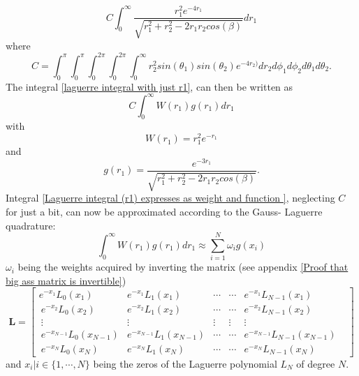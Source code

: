 \documentclass[10pt,a4paper]{article}
\begin{document}
\begin{equation}\label{laguerre integral with just r1}
C\int_{0}^{\infty}\frac{r_1^2e^{-4r_1}}{\sqrt{r_1^2+r_2^2-2r_1r_2cos(\beta)}}dr_1
\end{equation}
where
\begin{equation*}
C = \int_{0}^{\pi}\int_{0}^{\pi}\int_{0}^{2\pi}\int_{0}^{2\pi}\int_{0}^{\infty} r_2^2sin(\theta_1)sin(\theta_2)e^{-4r_2)}dr_2d\phi_1d\phi_2d\theta_1d\theta_2.
\end{equation*}
The integral \ref{laguerre integral with just r1}, can then be written as
\begin{equation}\label{Laguerre integral (r1) expresses as weight and function }
C\int_{0}^{\infty}W(r_1)g(r_1)dr_1
\end{equation}
with
\begin{equation*}
W(r_1)=r_1^2 e^{-r_1}
\end{equation*}
and
\begin{equation*}
g(r_1)=\frac{e^{-3r_1}}{\sqrt{r_1^2+r_2^2-2r_1r_2cos(\beta)}}.
\end{equation*}
Integral \ref{Laguerre integral (r1) expresses as weight and function }, neglecting $C$ for just a bit, can now be approximated according to the Gauss- Laguerre quadrature:
\begin{equation}
\int_{0}^{\infty}W(r_1)g(r_1)dr_1 \approx \sum\limits_{i=1}^N \omega_i g(x_i)
\end{equation}
$\omega_i$ being the weights acquired by inverting the matrix (see appendix \ref{Proof that big ass matrix is invertible})
\begin{equation}\label{Big ass matrix}
\textbf{L}=
\begin{bmatrix}
e^{-x_{1}}L_{0}(x_{1}) & e^{-x_{1}} L_{1}( x_{1}) & \cdots &\cdots & e^{-x_{1}} L_{N-1} (x_{1})\\\ e^{-x_{2}} L_{0}( x_{2}) & e^{-x_{2}} L_{1}( x_{2}) & \cdots & \cdots &e^{-x_{2}} L_{N-1}( x_{2})\\\ \vdots & \vdots & \vdots & \vdots & \vdots & \\\ e^{-x_{N-1}} L_{0}( x_{N-1}) & e^{-x_{N-1}} L_{1}( x_{N-1}) & \cdots & \cdots & e^{-x_{N-1}} L_{N-1}( x_{N-1})\\\ e^{-x_{N}} L_{0}( x_{N}) & e^{-x_{N}} L_{1}( x_{N}) & \cdots & \cdots & e^{-x_{N}} L_{N-1}( x_{N})
\end{bmatrix}
\end{equation}
and $x_i | i \in \{1,\cdots,N \}$ being the zeros of the Laguerre polynomial $L_N$ of degree $N$.
\end{document}
